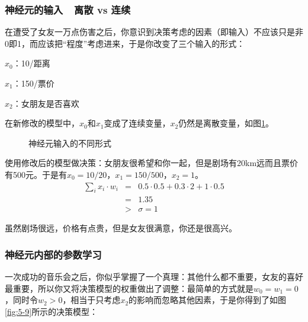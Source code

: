 \subsubsection{神经元的输入\ \dash \ 离散 vs 连续}

\parinterval 在遭受了女友一万点伤害之后，你意识到决策考虑的因素（即输入）不应该只是非0即1，而应该把``程度''考虑进来，于是你改变了三个输入的形式：

\parinterval $ x_0 $：10/距离

\parinterval $ x_1 $：150/票价

\parinterval $ x_2 $：女朋友是否喜欢

\parinterval 在新修改的模型中，$ x_0 $和$ x_1 $变成了连续变量，$ x_2 $仍然是离散变量，如图\ref{fig:5-8}。

\begin{figure}[htp]
\centering

\caption{神经元输入的不同形式}
\label{fig:5-8}
\end{figure}

\parinterval 使用修改后的模型做决策：女朋友很希望和你一起，但是剧场有20km远而且票价有500元。于是有$ x_0=10/20 $，$ x_1=150/500 $，$ x_2=1 $。
\begin{eqnarray}
\sum_{i}{x_i\cdot w_i} & = & 0.5\cdot 0.5+0.3\cdot 2+1\cdot 0.5 \nonumber \\
                                   & = & 1.35 \nonumber \\
                                   & > & \sigma =1
\label{eq:5-22}
\end{eqnarray}

\parinterval 虽然剧场很远，价格有点贵，但是女友很满意，你还是很高兴。


\subsubsection{神经元内部的参数学习}

\parinterval 一次成功的音乐会之后，你似乎掌握了一个真理：其他什么都不重要，女友的喜好最重要，所以你又将决策模型的权重做出了调整：最简单的方式就是$ w_0=w_1=0 $，同时令$ w_2>0 $，相当于只考虑$ x_2 $的影响而忽略其他因素，于是你得到了如图\ref {fig:5-9}所示的决策模型：

